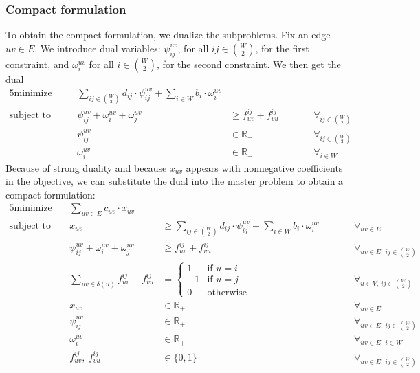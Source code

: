 \subsubsection{Compact formulation}
To obtain the compact formulation, we dualize the subproblems.
Fix an edge $uv \in E$.
We introduce dual variables: $\psi_{ij}^{uv}$, for all $ij \in \binom W 2$, for the first constraint, and $\omega_i^{uv}$ for all $i \in \binom W 2$, for the second constraint.
We then get the dual
\begin{alignat*}{5}
    \text{minimize}\quad && \sum_{ij \in \binom{W}{2}} d_{ij} \cdot \psi_{ij}^{uv} + \sum_{i \in W} b_i \cdot \omega_i^{uv} &&& \\
    \text{subject to}\quad && \psi_{ij}^{uv} + \omega_i^{uv} + \omega_j^{uv} &\ge f_{uv}^{ij} + f_{vu}^{ij} &&\qquad \forall_{ij \in \binom W 2} \\
    && \psi_{ij}^{uv} &\in \mathbb{R}_+ &&\qquad \forall_{ij \in \binom{W}{2}} \\
    && \omega_i^{uv} &\in \mathbb{R}_+ &&\qquad \forall_{i \in W}
\end{alignat*}
Because of strong duality and because $x_{uv}$ appears with nonnegative coefficients in the objective, we can substitute the dual into the master problem to obtain a compact formulation:
\begin{alignat*}{5}
    \text{minimize}\ && \sum_{uv \in E} c_{uv} \cdot x_{uv} &&& \\
    \text{subject to}\ && x_{uv} &\ge \sum_{ij \in \binom{W}{2}} d_{ij} \cdot \psi_{ij}^{uv} + \sum_{i \in W} b_i \cdot \omega_i^{uv} &&\qquad \forall_{uv \in E} \\
    && \psi_{ij}^{uv} + \omega_i^{uv} + \omega_j^{uv} &\ge f_{uv}^{ij} + f_{vu}^{ij} &&\qquad \forall_{uv \in E,\ ij \in \binom W 2} \\
    && \sum_{uv \in \delta(u)} f_{uv}^{ij} - f_{vu}^{ij} &= \begin{cases}
                                                                1 & \text{if $u = i$} \\
                                                                -1 & \text{if $u = j$} \\
                                                                0 & \text{otherwise}
    \end{cases} &&\qquad \forall_{u \in V,\ ij \in \binom{W}{2}} \\
    && x_{uv} &\in \mathbb{R}_+ &&\qquad \forall_{uv \in E} \\
    && \psi_{ij}^{uv} &\in \mathbb{R}_+ &&\qquad \forall_{uv \in E,\ ij \in \binom{W}{2}} \\
    && \omega_i^{uv} &\in \mathbb{R}_+ &&\qquad \forall_{uv \in E,\ i \in W} \\
    && f_{uv}^{ij},\ f_{vu}^{ij} &\in \{ 0, 1 \} &&\qquad \forall_{uv \in E,\ ij \in \binom{W}{2}}
\end{alignat*}

